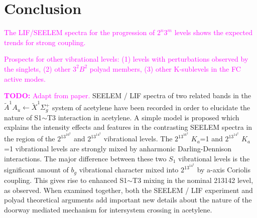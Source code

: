 \documentclass[12pt,draft]{mitthesis}
\newcommand{\TODO} [1]{\textcolor{magenta}{\textbf{TODO:} #1}}
\newcommand{\POINT}[1]{\textcolor{magenta}{#1}}
\begin{document}










\section{Conclusion}

\POINT{The LIF/SEELEM spectra for the progression of $2^n3^m$ levels
  shows the expected trends for strong coupling.}

\POINT{Prospects for other vibrational levels: (1) levels with
  perturbations observed by the singlets, (2) other $3^2B^2$ polyad
  members, (3) other K-sublevels in the FC active modes.}

\TODO{Adapt from paper.}  SEELEM / LIF spectra of two related bands in
the $\tilde{A}^1A_u \leftarrow \tilde{X} ^1\Sigma_g^+$ system of
acetylene have been recorded in order to elucidate the nature of
S1$\sim$T3 interaction in acetylene. A simple model is proposed which
explains the intensity effects and features in the contrasting SEELEM
spectra in the region of the $2^13^16^2$ and $2^13^14^2$ vibrational
levels. The $2^13^16^2$ $K_a$=1 and $2^13^14^2$ $K_a$=1 vibrational
levels are strongly mixed by anharmonic Darling-Dennison
interactions. The major difference between these two $S_1$ vibrational
levels is the significant amount of $b_g$ vibrational character mixed
into $2^13^14^2$ by a-axis Coriolis coupling. This gives rise to
enhanced S1$\sim$T3 mixing in the nominal 213142 level, as observed.
When examined together, both the SEELEM / LIF experiment and polyad
theoretical arguments add important new details about the nature of
the doorway mediated mechanism for intersystem crossing in acetylene.
\end{document}
